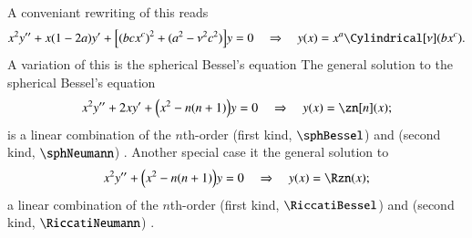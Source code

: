 A conveniant rewriting of this reads
\begin{equation}\label{eq:cylinder:Bessel_eq_abc}
    x^2y'' + x{(1-2a)}y'+ \bclosed{ {(bcx^{c})}^2 + {(a^2-\nu^2 c^2)} }y = 0 \quad\Rightarrow\quad y(x) = x^a \Cylindrical[\nu](bx^c).
\end{equation}
A variation of this is the spherical Bessel's equation
The general solution to the spherical Bessel's equation
\begin{equation}\label{eq:cylinder:spherical_Bessel_eq}
    x^2 y'' + 2x y' + \pclosed{ x^2 - n(n+1) }y = 0 \quad\Rightarrow\quad y(x)=\zn[n](x);
\end{equation}
is a linear combination of the $n$th-order  (first kind, $\sphBessel$) and  (second kind, $\sphNeumann$) . 
Another special case it the general solution to
\begin{equation}\label{eq:cylinder:Riccati_Bessel_eq}
    x^2 y'' + \pclosed{ x^2 - n(n+1) }y = 0 \quad\Rightarrow\quad y(x)= \Rzn(x);
\end{equation}
a linear combination of the $n$th-order  (first kind, $\RiccatiBessel$) and  (second kind, $\RiccatiNeumann$) .




